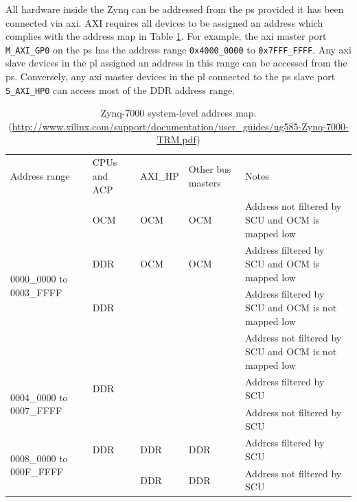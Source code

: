 All hardware inside the Zynq can be addressed from the \gls{ps} provided it has been connected via \gls{axi}. AXI requires all devices to be assigned an address which complies with the address map in Table \ref{table:zynq_address_map}. For example, the \gls{axi} master port \texttt{M\_AXI\_GP0} on the \gls{ps} has the address range \texttt{0x4000\_0000} to \texttt{0x7FFF\_FFFF}. Any \gls{axi} slave devices in the \gls{pl} assigned an address in this range can be accessed from the \gls{ps}. Conversely, any \gls{axi} master devices in the \gls{pl} connected to the \gls{ps} slave port \texttt{S\_AXI\_HP0} can access most of the DDR address range.

\begin{table}[]
\centering
\caption{Zynq-7000 system-level address map. (\url{http://www.xilinx.com/support/documentation/user_guides/ug585-Zynq-7000-TRM.pdf})}
\label{table:zynq_address_map}
\begin{tabular}{lllll}
Address range                             & CPUs and ACP & AXI\_HP & Other bus masters & Notes                                                 \\
\multirow{4}{*}{0000\_0000 to 0003\_FFFF} & OCM          & OCM     & OCM               & Address not filtered by SCU and OCM is mapped low     \\
                                          & DDR          & OCM     & OCM               & Address filtered by SCU and OCM is mapped low         \\
                                          & DDR          &         &                   & Address filtered by SCU and OCM is not mapped low     \\
                                          &              &         &                   & Address not filtered by SCU and OCM is not mapped low \\
\multirow{2}{*}{0004\_0000 to 0007\_FFFF} & DDR          &         &                   & Address filtered by SCU                               \\
                                          &              &         &                   & Address not filtered by SCU                           \\
\multirow{2}{*}{0008\_0000 to 000F\_FFFF} & DDR          & DDR     & DDR               & Address filtered by SCU                               \\
                                          &              & DDR     & DDR               & Address not filtered by SCU                           \\

\end{tabular}
\end{table}
